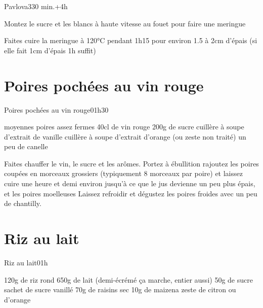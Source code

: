 {\begin{recette}{Pavlova}{3}{30 min.+4h}{}
\begin{preparation}
\etape Montez le sucre et les blancs à haute vitesse au fouet pour faire une meringue
\end{preparation}
\begin{cuisson}
Faites cuire la meringue à 120°C pendant 1h15  pour environ 1.5 à 2cm d'épais (si elle fait 1cm d'épais 1h suffit)
\end{cuisson}
\end{recette}

\section{Poires pochées au vin rouge}
\begin{recette}{Poires pochées au vin rouge}{0}{1h30}{}
\begin{ingredients}
 moyennes poires assez fermes
\ingredient 40cl de vin rouge
\ingredient 200g de sucre
 cuillère à soupe d'extrait de vanille
 cuillère à soupe d'extrait d'orange (ou zeste non traité)
\ingredient un peu de canelle
\end{ingredients}

\begin{preparation}
\etape Faites chauffer le vin, le sucre et les arômes. Portez à ébullition
\etape rajoutez les poires coupées en morceaux grossiers (typiquement 8 morceaux par poire) et laissez cuire une heure et demi 
environ jusqu'à ce que le jus devienne un peu plus épais, et les poires moelleuses
\etape Laissez refroidir et dégustez les poires froides avec un peu de chantilly.
\end{preparation}
\end{recette}

\section{Riz au lait}
\begin{recette}{Riz au lait}{0}{1h}{}
\begin{ingredients}[4 pers.]
\ingredient 120g de riz rond
\ingredient 650g de lait (demi-écrémé ça marche, entier aussi)%
\ingredient 50g de sucre
 sachet de sucre vanillé
\ingredient 70g de raisins sec
\ingredient 10g de maizena
\ingredient zeste de citron ou d'orange
\end{ingredients}


\end{recette}}
